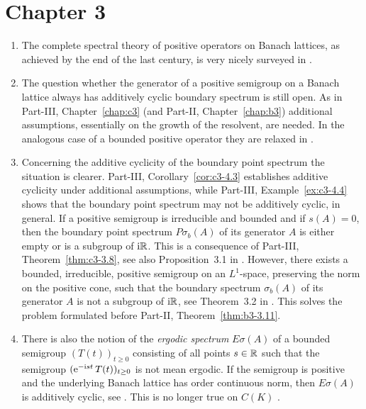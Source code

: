 \section*{Chapter 3}
\begin{enumerate}

\item 
The complete spectral theory of positive operators on Banach lattices, as achieved by the end of the last century,
is very nicely surveyed in \textcite{zbmath00774970}.

\item 
The question whether the generator of a positive semigroup on a Banach lattice always has additively cyclic boundary spectrum is still open. 
As in Part-III, Chapter~\ref{chap:c3}  (and Part-II, Chapter~\ref{chap:b3}) additional assumptions, essentially on the growth of the resolvent, are needed. 
In the analogous case of a bounded positive operator they are relaxed in \textcite{zbmath06591946}.


\item 
Concerning the additive cyclicity of the boundary point spectrum the situation is clearer. 
Part-III, Corollary~\ref{cor:c3-4.3} establishes additive cyclicity under additional assumptions, while 
Part-III, Example~\ref{ex:c3-4.4} shows that the boundary point spectrum may not be additively cyclic, in general.
If a positive semigroup is irreducible and bounded and if $s(A) = 0$,  then the boundary point spectrum $P\sigma_{b}(A)$ of its generator $A$ is either empty or is a subgroup of $\mathrm{i}\mathbb{R}$. 
This is a consequence of Part-III, Theorem~\ref{thm:c3-3.8}, see also Proposition~3.1 in \textcite{zbmath07423250}.
However, there exists a bounded, irreducible, positive semigroup on an $L^{1}$-space,  preserving the norm  on the positive cone, such that the  boundary spectrum 
$\sigma_{b}(A)$ of its generator $A$ 
is not a subgroup of $\mathrm{i}\mathbb{R}$, see Theorem~3.2 in \textcite{zbmath07423250}.
This solves the problem formulated before  Part-II, Theorem~\ref{thm:b3-3.11}.

\item 
There is also the notion of the \emph{ergodic spectrum} $E\sigma(A)$ of a bounded semigroup $(T(t))_{t\geq 0}$ consisting of all points $s\in\mathbb{R}$ such that the semigroup 
$(\mathrm{e}^{-\im st}\,T(t))_{t\geq 0}$
is not mean ergodic. 
If the semigroup is positive and the underlying Banach lattice has order continuous norm, then $E\sigma(A)$ is additively cyclic,
see \textcite{zbmath00763800}. 
This is no longer true on $C(K)$ . 


\end{enumerate}

